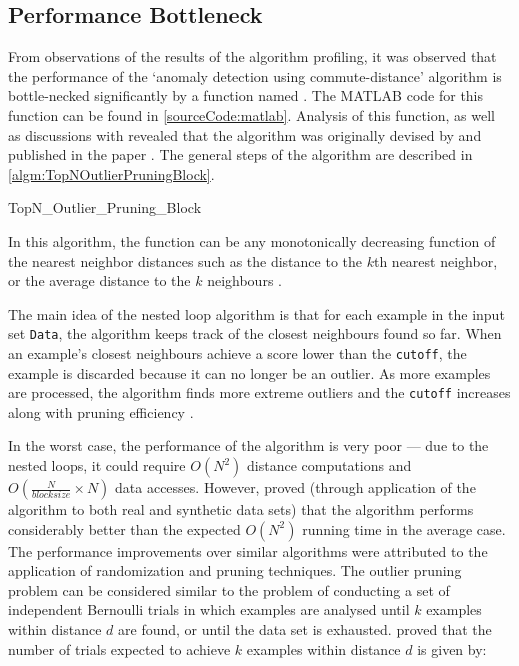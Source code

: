 \subsection{Performance Bottleneck}
\label{algorithmPerformance:bottleneck}
From observations of the results of the algorithm profiling, it was observed
that the performance of the `anomaly detection using commute-distance' algorithm
is bottle-necked significantly by a function named
. The MATLAB code for this function can be
found in \autoref{sourceCode:matlab}. Analysis of this function, as well as
discussions with \citeauthor{Khoa:2012} revealed that the algorithm was
originally devised by \citeauthor{Bay:2003} and published in the paper
. The general steps of the algorithm are described in
\autoref{algm:TopNOutlierPruningBlock}.

\begin{algorithm}
    
    \caption{TopN\_Outlier\_Pruning\_Block}
    \label{algm:TopNOutlierPruningBlock}
\end{algorithm}

In this algorithm, the  function can be any monotonically
decreasing function of the nearest neighbor distances such as the distance to
the $k$th nearest neighbor, or the average distance to the $k$ neighbours
\cite{Bay:2003}.

The main idea of the nested loop algorithm is that for each example in the
input set \verb+Data+, the algorithm keeps track of the closest neighbours found
so far. When an example's closest neighbours achieve a score lower than the
\verb+cutoff+, the example is discarded because it can no longer be an outlier.
As more examples are processed, the algorithm finds more extreme outliers and
the \verb+cutoff+ increases along with pruning efficiency \cite{Bay:2003}.

In the worst case, the performance of the algorithm is very poor --- due to the
nested loops, it could require $O(N^{2})$ distance computations and
$O(\frac{N}{blocksize} \times N)$ data accesses. However, \citeauthor{Bay:2003}
proved (through application of the algorithm to both real and synthetic data
sets) that the algorithm performs considerably better than the expected
$O(N^{2})$ running time in the average case. The performance improvements over
similar algorithms were attributed to the application of randomization and
pruning techniques. The outlier pruning problem can be considered similar to the
problem of conducting a set of independent Bernoulli trials in which examples
are analysed until $k$ examples within distance $d$ are found, or until the data
set is exhausted. \citeauthor{Bay:2003} proved that the number of trials
expected to achieve $k$ examples within distance $d$ is given by:

